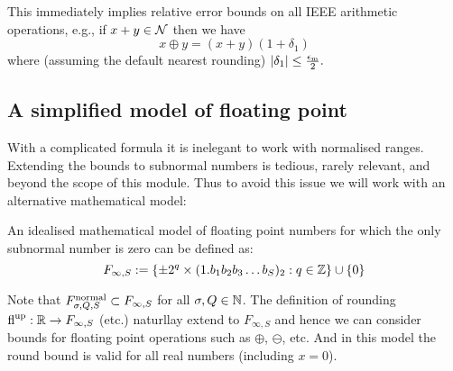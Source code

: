 This immediately implies relative error bounds on all IEEE arithmetic operations, e.g., if $x+y \in {\cal N}$ then we have
\[
x \ensuremath{\oplus} y = (x+y) (1 + \ensuremath{\delta}_1)
\]
where (assuming the default nearest rounding) $|\ensuremath{\delta}_1| \ensuremath{\leq} {\ensuremath{\epsilon}_{\rm m} \over 2}.$

\subsection{A simplified model of floating point}
With a complicated formula it is inelegant to work with normalised ranges. Extending the bounds to subnormal numbers is tedious, rarely relevant, and beyond the scope of this module. Thus to avoid this issue we will work with an alternative mathematical model:

\begin{definition} An idealised mathematical model of floating point numbers for which the only subnormal number is zero can be defined as:
\[
F_{\infty,S} := \{\pm 2^q \times (1.b_1b_2b_3\ldots b_S)_2 :  q \in {\mathbb Z} \} \cup \{0\}
\]
\end{definition}

Note that $F^{\rm normal}_{\ensuremath{\sigma},Q,S} \ensuremath{\subset} F_{\ensuremath{\infty},S}$ for all $\sigma,Q \in {\mathbb N}$. The definition of rounding ${\rm fl}^{\rm up} : {\mathbb R} \rightarrow F_{\infty,S}$ (etc.) naturllay extend to $F_{\ensuremath{\infty},S}$ and hence we can consider bounds for floating point operations such as $\ensuremath{\oplus}$, $\ensuremath{\ominus}$, etc. And in this model the round bound is valid for all real numbers (including $x = 0$).

